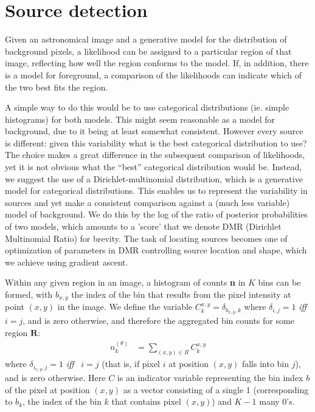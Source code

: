 \documentclass[
    ,final            %
  ]
  {aipproc}
\begin{document}
\section{Source detection} %
Given an astronomical image and a generative model for the
distribution of background pixels, a likelihood can be assigned to a
particular region of that image, reflecting how well the region
conforms to the model. If, in addition, there is a model for
foreground, a comparison of the likelihoods can indicate which of the
two best fits the region.

A simple way to do this would be to use categorical distributions
(ie. simple histograms) for both models. This might seem reasonable as
a model for background, due to it being at least somewhat
consistent. However every source is different: given this variability
what is the best categorical distribution to use? The choice makes a
great difference in the subsequent comparison of likelihoods, yet it
is not obvious what the ``best'' categorical distribution would be.
Instead, we suggest the use of a Dirichlet-multinomial distribution,
which is a generative model for categorical distributions. This
enables us to represent the variability in sources and yet make a
consistent comparison against a (much less variable) model of
background.  We do this by the log of the ratio of posterior
probabilities of two models, which amounts to a 'score' that we denote
DMR (Dirichlet Multinomial Ratio) for brevity.  The task of locating sources
becomes one of optimization of parameters in DMR controlling source
location and shape, which we achieve using gradient ascent.

Within any given region in an image, a histogram of counts \textbf{n} in $K$ bins can be formed, with $b_{x,y}$ the index of the bin that results from the pixel intensity at point $(x,y)$ in the image.
We define the variable $C^{x,y}_k =\delta_{b_{x,y},k}$ where $\delta_{i,j}=1$ {\it iff} \, $i=j$, and is zero otherwise, and therefore the aggregated bin counts for some region $\mathbf{R}$:
\begin{align}
n_k^{(\theta)} &= \sum_{(x,y) \in R} C^{x,y}_k
\end{align}
where $\delta_{i_{x,y},j}=1$ {\it iff} \, $i=j$ (that is, if pixel $i$ at position $(x,y)$ falls into bin $j$), and is zero otherwise. Here $C$ is an indicator variable 
representing the bin index $b$ of the pixel at position $(x,y)$ as a vector consisting of a single 1 (corresponding to $b_k$, the index of the bin $k$ that contains pixel $(x,y)$) and $K-1$ many 0's. 
\end{document}
